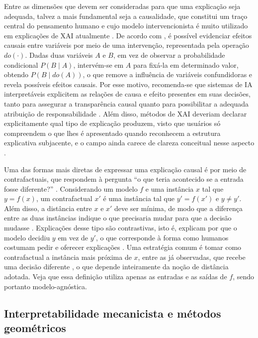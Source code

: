 Entre as dimensões que devem ser consideradas para que uma explicação seja adequada, talvez a mais fundamental seja a causalidade, que constitui um traço central do pensamento humano \citep{Bender2020} e cujo modelo intervencionista é muito utilizado em explicações de XAI atualmente \citep{Guidotti2022}. De acordo com \cite{Pearl2009}, é possível evidenciar efeitos causais entre variáveis por meio de uma intervenção, representada pela operação \(do(\cdot)\). Dadas duas variáveis \(A\) e \(B\), em vez de observar a probabilidade condicional \(P(B \mid A)\), intervém-se em \(A\) para fixá-la em determinado valor, obtendo \(P(B \mid do(A))\), o que remove a influência de variáveis confundidoras e revela possíveis efeitos causais. Por esse motivo, recomenda-se que sistemas de IA interpretáveis explicitem as relações de causa e efeito presentes em suas decisões, tanto para assegurar a transparência causal quanto para possibilitar a adequada atribuição de responsabilidade \citep{Bender2020, Baum2022}. Além disso, métodos de XAI deveriam declarar explicitamente qual tipo de explicação produzem, visto que usuários só compreendem o que lhes é apresentado quando reconhecem a estrutura explicativa subjacente, e o campo ainda carece de clareza conceitual nesse aspecto \citep{Graff2025, Mersha2024, Pawlicki2024}.

Uma das formas mais diretas de expressar uma explicação causal é por meio de contrafactuais, que respondem à pergunta ``o que teria acontecido se a entrada fosse diferente?'' \citep{Pearl2009, Wachter2018}. Considerando um modelo \(f\) e uma instância \(x\) tal que \(y = f(x)\), um contrafactual \(x'\) é uma instância tal que \(y' = f(x')\) e \(y \neq y'\). Além disso, a distância entre \(x\) e \(x'\) deve ser mínima, de modo que a diferença entre as duas instâncias indique o que precisaria mudar para que a decisão mudasse \citep{Guidotti2022}. Explicações desse tipo são contrastivas, isto é, explicam por que o modelo decidiu \(y\) em vez de \(y'\), o que corresponde à forma como humanos costumam pedir e oferecer explicações \citep{Miller2019}. Uma estratégia comum é tomar como contrafactual a instância mais próxima de \(x\), entre as já observadas, que recebe uma decisão diferente \citep{KeaneSmyth2020, Brughmans2024}, o que depende inteiramente da noção de distância adotada. Veja que essa definição utiliza apenas as entradas e as saídas de \(f\), sendo portanto modelo-agnóstica.

\subsection{Interpretabilidade mecanicista e métodos geométricos}

